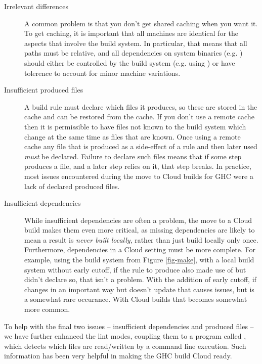 \begin{description}
\item[Irrelevant differences] A common problem is that you don't get shared caching when you want it. To get caching, it is important that all machines are identical for the aspects that involve the build system. In particular, that means that all paths must be relative, and all dependencies on system binaries (e.g. ) should either be controlled by the build system (e.g. using \Nix) or have tolerence to account for minor machine variations.
\item[Insufficient produced files] A build rule must declare which files it produces, so these are stored in the cache and can be restored from the cache. If you don't use a remote cache then it is permissible to have files not known to the build system which change at the same time as files that are known. Once using a remote cache any file that is produced as a side-effect of a rule and then later used \emph{must} be declared. Failure to declare such files means that if some step produces a file, and a later step relies on it, that step breaks. In practice, most issues encountered during the move to Cloud builds for GHC were a lack of declared produced files.
\item[Insufficient dependencies] While insufficient dependencies are often a problem, the move to a Cloud build makes them even more critical, as missing dependencies are likely to mean a result is \emph{never built locally}, rather than just build locally only once. Furthermore, dependencies in a Cloud setting must be more complete. For example, using the build system from Figure \ref{fig-make}, with a local build system without early cutoff, if the rule to produce  also made use of  but didn't declare so, that isn't a problem. With the addition of early cutoff, if  changes in an important way but  doesn't update that causes issues, but is a somewhat rare occurance. With Cloud builds that becomes somewhat more common.
\end{description}

To help with the final two issues -- insufficient dependencies and produced files -- we have further enhanced the \Shake lint modes, coupling them to a program called , which detects which files are read/written by a command line execution. Such information has been very helpful in making the GHC build Cloud ready.

